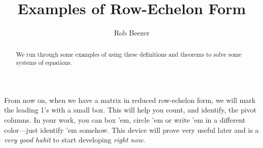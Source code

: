 \documentclass{ximera}
\author{Rob Beezer}
\title{Examples of Row-Echelon Form}
\begin{document}
\begin{abstract}
  We run through some examples of using these definitions and theorems
  to solve some systems of equations.
\end{abstract}
\maketitle

From now on, when we have a matrix in reduced row-echelon form, we
will mark the leading 1's with a small box.  This will help you count,
and identify, the pivot columns.  In your work, you can box 'em,
circle 'em or write 'em in a different color---just identify 'em
somehow.  This device will prove very useful later and is a
\textit{very good habit} to start developing \textit{right now}.
\end{document}
